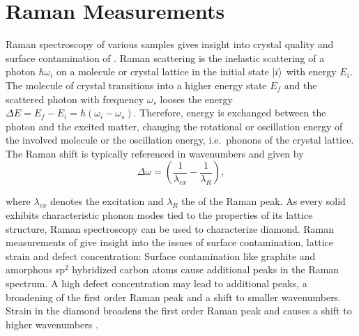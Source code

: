 
		\section{Raman Measurements} \label{sec::raman}

			Raman spectroscopy of various samples gives insight into crystal quality and surface contamination of \nds.
			Raman scattering is the inelastic scattering of a photon $\hbar\omega_i$ on a molecule or crystal lattice in the initial state $\ket{i}$ with energy $E_i$.
			The molecule of crystal transitions into a higher energy state $E_f$ and the scattered photon with frequency $\omega_s$ looses the energy $\Delta E = E_f - E_i = \hbar(\omega_i-\omega_s)$.
			Therefore, energy is exchanged between the photon and the excited matter, changing the rotational or oscillation energy of the involved molecule or the oscillation energy, i.e.\ phonons of the crystal lattice.
			The Raman shift is typically referenced in wavenumbers and given by
			\begin{equation}
				\Delta \omega = \left( \frac{1}{\lambda_{ex}}-\frac{1}{\lambda_R}\right) ,
			\end{equation}

			where $\lambda_{ex}$ denotes the excitation \wl and $\lambda_R$ the \cwl of the Raman peak.
			As every solid exhibits characteristic phonon modes tied to the properties of its lattice structure, Raman spectroscopy can be used to characterize diamond.
			Raman measurements of \nds give insight into the issues of surface contamination, lattice strain and defect concentration:
			Surface contamination like graphite and amorphous sp$^2$ hybridized carbon atoms cause additional peaks in the Raman spectrum.
			A high defect concentration may lead to additional peaks, a broadening of the first order Raman peak and a shift to smaller wavenumbers.
			Strain in the diamond broadens the first order Raman peak and causes a shift to higher wavenumbers \cite{Zaitsev2001,Prawer2004,Orwa2000}.
			
